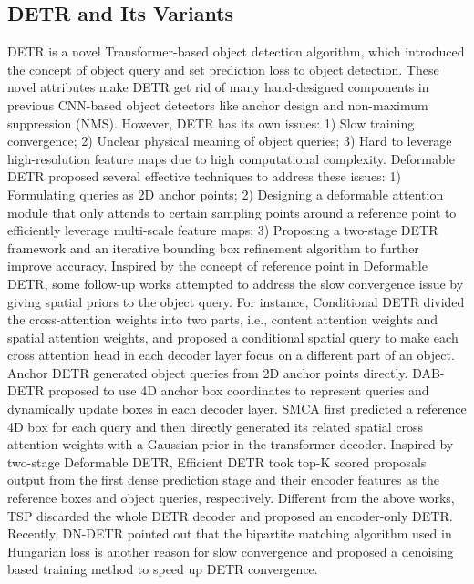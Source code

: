 \documentclass[sigconf]{acmart}
\begin{document}
\subsection{DETR and Its Variants}
DETR \cite{detr2020} is a novel Transformer-based \cite{transformer2017} object detection algorithm, which introduced the concept of object query and set prediction loss to object detection. These novel attributes make DETR get rid of many hand-designed components in previous CNN-based object detectors like anchor design and non-maximum suppression (NMS). However, DETR has its own issues: 1) Slow training convergence; 2) Unclear physical meaning of object queries; 3) Hard to leverage high-resolution feature maps due to high computational complexity. Deformable DETR \cite{deformdetr2021} proposed several effective techniques to address these issues: 1) Formulating queries as 2D anchor points; 2) Designing a deformable attention module that only attends to certain sampling points around a reference point to efficiently leverage multi-scale feature maps; 3) Proposing a two-stage DETR framework and an iterative bounding box refinement algorithm to further improve accuracy. Inspired by the concept of reference point in Deformable DETR, some follow-up works attempted to address the slow convergence issue by giving spatial priors to the object query. For instance, Conditional DETR \cite{meng2021conditional} divided the cross-attention weights into two parts, i.e., content attention weights and spatial attention weights, and proposed a conditional spatial query to make each cross attention head in each decoder layer focus on a different part of an object. Anchor DETR \cite{wang2021anchor} generated object queries from 2D anchor points directly. DAB-DETR \cite{liu2022dab} proposed to use 4D anchor box coordinates to represent queries and dynamically update boxes in each decoder layer. SMCA \cite{gao2021fast} first predicted a reference 4D box for each query and then directly generated its related spatial cross attention weights with a Gaussian prior in the transformer decoder. Inspired by two-stage Deformable DETR, Efficient DETR \cite{efficientdetr} took top-K scored proposals output from the first dense prediction stage and their encoder features as the reference boxes and object queries, respectively. Different from the above works, TSP \cite{sun2021rethinking} discarded the whole DETR decoder and proposed an encoder-only DETR. Recently, DN-DETR \cite{li2022dn} pointed out that the bipartite matching algorithm used in Hungarian loss is another reason for slow convergence and proposed a denoising based training method to speed up DETR convergence. 
\end{document}
